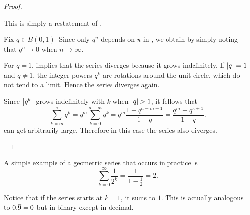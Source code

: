 \begin{proof}\mbox{}
  \begin{description}
     This is simply a restatement of .

     Fix \( q \in B(0, 1) \). Since only \( q^n \) depends on \( n \) in , we obtain  by simply noting that \( q^n \to 0 \) when \( n \to \infty \).

     For \( q = 1 \),  implies that the series diverges because it grows indefinitely. If \( \left\vert q \right\vert = 1 \) and \( q \neq 1 \), the integer powers \( q^k \) are rotations around the unit circle, which do not tend to a limit. Hence the series diverges again.

    Since \( \left\vert q^k \right\vert \) grows indefinitely with \( k \) when \( \left\vert q \right\vert > 1 \), it follows that
    \begin{equation*}\label{thm:geometric_progression/cauchy_partial_sum}
      \sum_{k=m}^n q^k
      =
      q^m \sum_{k=0}^{n-m} q^k
      =
      q^m \frac {1 - q^{n-m+1}} {1 - q}
      =
      \frac {q^m - q^{n+1}} {1 - q}.
    \end{equation*}
    can get arbitrarily large. Therefore in this case the series also diverges.
  \end{description}
\end{proof}

\begin{example}\label{ex:series_of_reciprocal_powers_of_two}
  A simple example of a \hyperref[def:geometric_progression/series]{geometric series} that occurs in practice is
  \begin{equation}\label{ex:series_of_reciprocal_powers_of_two/series}
    \sum_{k=0}^\infty \frac 1 {2^k} = \frac 1 {1 - \frac 1 2} = 2.
  \end{equation}

  Notice that if the series starts at \( k = 1 \), it sums to \( 1 \). This is actually analogous to \( 0.\overline{9} = 0 \) but in binary except in decimal.
\end{example}

